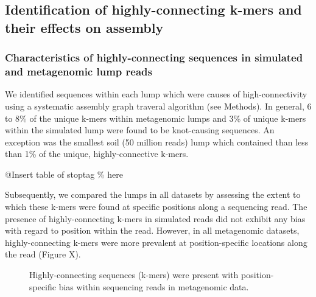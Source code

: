 \documentclass[11pt]{article} %
\begin{document}
\subsection{Identification of highly-connecting k-mers and their effects on assembly}

\subsubsection{Characteristics of highly-connecting sequences in simulated and metagenomic lump reads}

We identified sequences within each lump which were causes of high-connectivity using a systematic assembly graph traveral algorithm (see Methods).  In general, 6 to 8\% of the unique k-mers within metagenomic lumps and 3\% of unique k-mers within the simulated lump were found to be knot-causing sequences.  An exception was the smallest soil (50 million reads) lump which contained than less than 1\% of the unique, highly-connective k-mers.

@Insert table of stoptag \% here

Subsequently, we compared the lumps in all datasets by assessing the extent to which these k-mers were found at specific positions along a sequencing read.  The presence of highly-connecting k-mers in simulated reads did not exhibit any bias with regard to position within the read.  However, in all metagenomic datasets, highly-connecting k-mers were more prevalent at position-specific locations along the read (Figure X).  

\begin{figure}
\caption{Highly-connecting sequences (k-mers) were present with position-specific bias within sequencing reads in metagenomic data.}
\end{figure}
\end{document}
